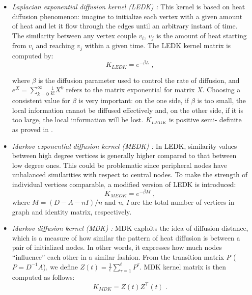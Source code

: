 \begin{itemize}
\item \textit{Laplacian exponential diffusion kernel (LEDK) \cite{proceeding2}:} This kernel is based on heat diffusion phenomenon: imagine to initialize each vertex with a given amount of heat and let it flow through the edges until an arbitrary instant of time. The similarity between any vertex couple $v_{i}$, $v_{j}$ is the amount of heat starting from $v_{i}$ and reaching $v_{j}$ within a given time. The LEDK kernel matrix is computed by:
\begin{equation}
K_{LEDK} = e^{-\beta L}\; ,
\end{equation}

where $\beta$ is the diffusion parameter used to control the rate of
diffusion, and $e^{X}=\sum_{k=0}^{\infty} \frac{1}{k!}X^k$ refers to the
matrix exponential for matrix $X$. Choosing a consistent value for $\beta$ is
very important: on the one side, if $\beta$ is too small, the local
information cannot be diffused effectively and, on the other side, if it is
too large, the local information will be lost. $K_{LEDK}$ is positive semi-
definite as proved in \cite{proceeding2}.

\item \textit{Markov exponential diffusion kernel (MEDK) \cite{proceeding3}:} In LEDK, similarity values between high degree vertices is generally higher compared to that between low degree ones. This could be problematic since peripheral nodes have unbalanced similarities with respect to central nodes. To make the strength of individual vertices comparable, a modified version of LEDK is introduced:
\begin{equation}
K_{MEDK} = e^{-\beta M}\; ,
\end{equation}
where $M = (D-A-nI)/n$ and \textit{n}, \textit{I} are the total number of vertices in graph and identity matrix, respectively.

\item \textit{Markov diffusion kernel (MDK) \cite{jour3}:} MDK exploits the idea of diffusion distance, which is a measure of how similar the pattern of heat diffusion is between a pair of initialized nodes. In other words, it expresses how much nodes ``influence'' each other in a similar fashion. From the transition matrix \textit{P} ($P = D^{-1} A$), we define $Z(t) = \frac{1}{t}\sum_{\tau=1}^{t} P^{\tau}$. MDK kernel matrix is then computed as follows:
\begin{equation}
K_{MDK} = Z(t) Z^{\top}(t)\; .
\end{equation}


\end{itemize}
